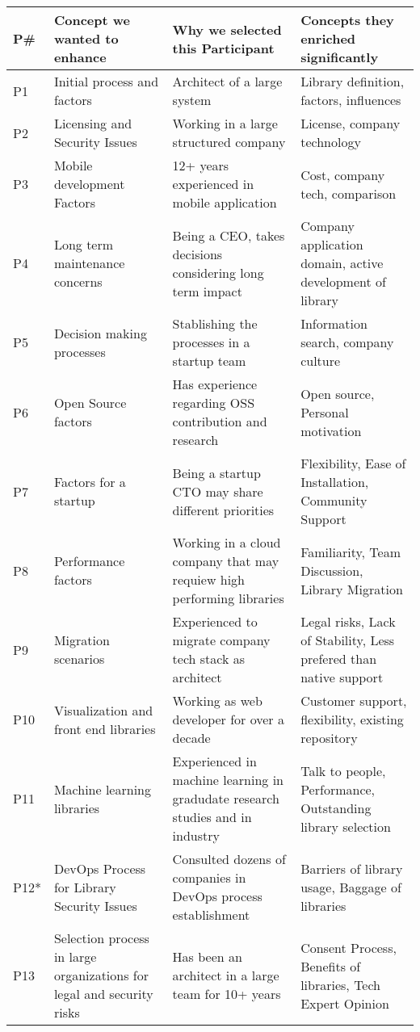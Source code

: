 \begin{table*}[]
    \centering
    \begin{tabular}{p{.4cm}p{4cm}p{6cm}p{6cm}}%
    \toprule
    P\# & Concept we wanted to enhance & Why we selected this Participant & Concepts they enriched significantly \\ 
    \midrule
P1 & Initial process and factors & Architect of a large system & Library definition, factors, influences \\ 
P2 & Licensing and Security Issues & Working in a large structured company & License, company technology \\ 
P3 & Mobile development Factors & 12+ years experienced in mobile application & Cost, company tech, comparison  \\ 
P4 & Long term maintenance concerns & Being a CEO, takes decisions considering long term impact & Company application domain, active development of library \\ 
P5 & Decision making processes & Stablishing the processes in a startup team & Information search, company culture \\ 
P6 & Open Source factors & Has experience regarding OSS contribution and research & Open source, Personal motivation \\ 
P7 & Factors for a startup & Being a startup CTO may share different priorities & Flexibility, Ease of Installation, Community Support \\ 
P8 & Performance factors & Working in a cloud company that may requiew high performing libraries & Familiarity, Team Discussion, Library Migration \\ 
P9 & Migration scenarios & Experienced to migrate company tech stack as architect & Legal risks, Lack of Stability, Less prefered than native support \\ 
P10 & Visualization and front end libraries & Working as web developer for over a decade & Customer support, flexibility, existing repository \\ 
P11 & Machine learning libraries & Experienced in machine learning in gradudate research studies and in industry & Talk to people, Performance, Outstanding library selection \\ 
P12* & DevOps Process for Library Security Issues & Consulted dozens of companies in DevOps process establishment & Barriers of library usage, Baggage of libraries \\ 
P13 & Selection process in large organizations for legal and security risks & Has been an architect in a large team for 10+ years & Consent Process, Benefits of libraries, Tech Expert Opinion \\ 

\end{tabular}
\end{table*}
